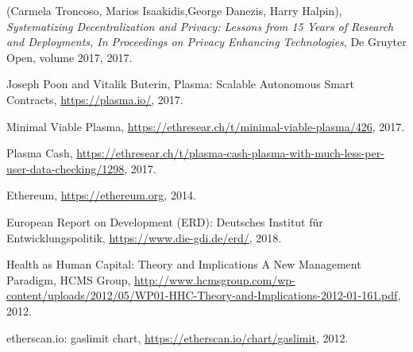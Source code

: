 
\begin{thebibliography}{9}

  (Carmela Troncoso, Marios Isaakidis,George Danezis, Harry Halpin),
  \textit{Systematizing Decentralization and Privacy: Lessons from 15 Years of Research and Deployments, In Proceedings on Privacy Enhancing Technologies},
  De Gruyter Open,
  volume 2017,
  2017.
  
  Joseph Poon and Vitalik Buterin, Plasma: Scalable Autonomous Smart Contracts,
  \url{https://plasma.io/},
  2017.
  
  Minimal Viable Plasma,
  \url{https://ethresear.ch/t/minimal-viable-plasma/426},
  2017.
  
  Plasma Cash,
  \url{https://ethresear.ch/t/plasma-cash-plasma-with-much-less-per-user-data-checking/1298},
  2017.
  
  Ethereum,
  \url{https://ethereum.org},
  2014.

  European Report on Development (ERD): Deutsches Institut für Entwicklungspolitik,
  \url{https://www.die-gdi.de/erd/},
  2018.
  
  Health as Human Capital: Theory and Implications A New Management Paradigm, HCMS Group,
  \url{http://www.hcmsgroup.com/wp-content/uploads/2012/05/WP01-HHC-Theory-and-Implications-2012-01-161.pdf},
  2012.
 
  etherscan.io: gaslimit chart,
  \url{https://etherscan.io/chart/gaslimit},
  2012. 

\end{thebibliography}

